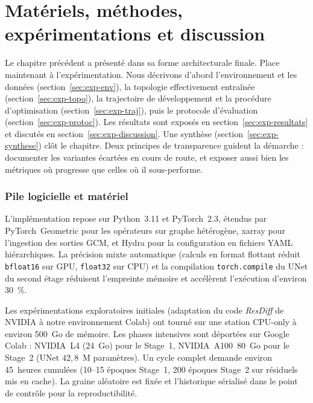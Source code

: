 \chapter{Matériels, méthodes, expérimentations et discussion}
\label{chap:experiences}


\vspace{1em}

\label{sec:exp-intro}

Le chapitre précédent a présenté \Oracle{} dans sa forme architecturale finale. Place maintenant à l'expérimentation. Nous décrivons d'abord l'environnement et les données (section~\ref{sec:exp-env}), la topologie effectivement entraînée (section~\ref{sec:exp-topo}), la trajectoire de développement et la procédure d'optimisation (section~\ref{sec:exp-traj}), puis le protocole d'évaluation (section~\ref{sec:exp-protoc}). Les résultats sont exposés en section~\ref{sec:exp-resultats} et discutés en section~\ref{sec:exp-discussion}. Une synthèse (section~\ref{sec:exp-synthese}) clôt le chapitre. Deux principes de transparence guident la démarche : documenter les variantes écartées en cours de route, et exposer aussi bien les métriques où \Oracle{} progresse que celles où il sous-performe.

\label{sec:exp-env}

\subsection{Pile logicielle et matériel}
\label{ssec:exp-env-soft}

L'implémentation repose sur Python~3.11 et PyTorch~2.3, étendus par PyTorch~Geometric pour les opérateurs sur graphe hétérogène, xarray pour l'ingestion des sorties GCM, et Hydra pour la configuration en fichiers YAML hiérarchiques. La précision mixte automatique (calculs en format flottant réduit \texttt{bfloat16} sur GPU, \texttt{float32} sur CPU) et la compilation \texttt{torch.compile} du UNet du second étage réduisent l'empreinte mémoire et accélèrent l'exécution d'environ 30~\%.

Les expérimentations exploratoires initiales (adaptation du code \emph{ResDiff} de NVIDIA à notre environnement Colab) ont tourné sur une station CPU-only à environ 500~Go de mémoire. Les phases intensives sont déportées sur Google Colab : NVIDIA~L4 (24~Go) pour le Stage~1, NVIDIA~A100~80~Go pour le Stage~2 (UNet $42{,}8$~M paramètres). Un cycle complet demande environ 45~heures cumulées (10--15 époques Stage~1, 200 époques Stage~2 sur résiduels mis en cache). La graine aléatoire est fixée et l'historique sérialisé dans le point de contrôle pour la reproductibilité.

